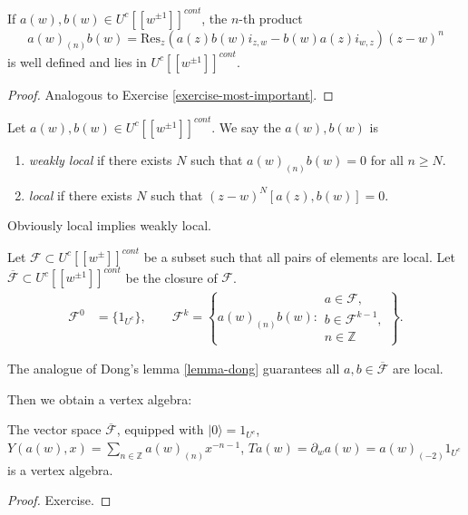 \begin{proposition}
\label{proposition-duplicate-2}
If $a(w),b(w)\in U^c[[w^{\pm 1}]]^{cont}$,
the $n$-th product
 $$
a(w)_{(n)}b(w)
=\text{Res}_z(a(z)b(w)i_{z,w}-b(w)a(z)i_{w,z}
)(z-w)^n
$$
is well defined and lies in $U^c[[w^{\pm
1}]]^{cont}$.
\end{proposition}

\begin{proof}
Analogous to Exercise
\ref{exercise-most-important}.
\end{proof}

\begin{definition}
\label{definition-local}
Let $a(w),b(w) \in U^c[[w^{\pm 1}]]^{cont}$.
We say the $a(w),b(w)$ is
 \begin{enumerate}
\item {\it weakly local} if there exists  $N$
such that
$a(w)_{(n)}b(w)=0$ for all $n \geq N$.
\item {\it local} if there exists $N$ such
that
$(z-w)^N[a(z),b(w)]=0$.
\end{enumerate}
\end{definition}

\noindent
Obviously local implies weakly local.

Let $\mathcal{F}\subset
U^c[[w^{\pm}]]^{cont}$ be a subset such that
all pairs of elements are local.
Let $\overline{\mathcal{F}}\subset
U^c[[w^{\pm 1}]]^{cont}$ be the
closure of $\mathcal{F}$.
 $$
\begin{aligned}
\mathcal{F}^0&=\{1_{U^c}\},\qquad
\mathcal{F}^k=\left\{a(w)_{(n)}b(w):
\substack{a
\in \mathcal{F}, \\
b \in \mathcal{F}^{k-1}, \\
n \in \mathbb{Z}}\right\}.
\end{aligned}
$$

\noindent
The analogue of Dong's lemma \ref{lemma-dong}
guarantees all
$a,b \in \overline{\mathcal{F}}$ are local.

Then we obtain a vertex algebra:

\begin{theorem}
\label{theorem-vertex-algebra-continuous}
The vector space $\overline{\mathcal{F}}$,
equipped with
$|0\rangle=1_{U^c}$,
$Y(a(w),x)=\sum_{n \in
\mathbb{Z}}a(w)_{(n)}x^{-n-1}$,
$Ta(w)=\partial_wa(w)=a(w)_{(-2)}1_{U^c}$ is
a vertex algebra.
\end{theorem}

\begin{proof}
Exercise.
\end{proof}

